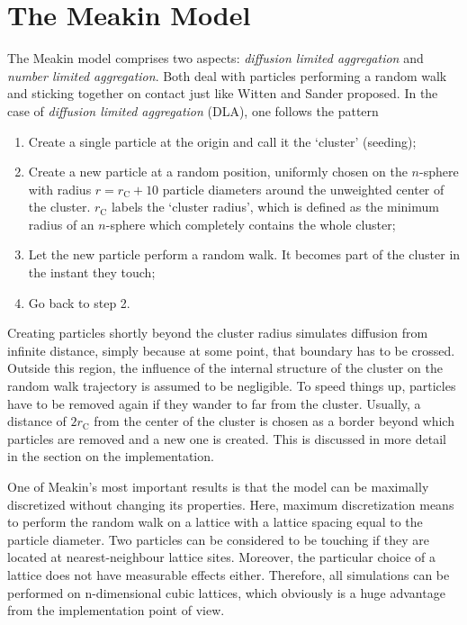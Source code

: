 \documentclass[twocolumn, 10pt]{scrartcl}
\begin{document}
    \section{The Meakin Model}
        The Meakin model comprises two aspects: \emph{diffusion limited aggregation} and \emph{number limited
        aggregation}. Both deal with particles performing a random walk and sticking together on contact just like
        Witten and Sander proposed. In the case of \emph{diffusion limited aggregation} (DLA), one follows the
        pattern
        \begin{enumerate}
            \item Create a single particle at the origin and call it the `cluster' (seeding);
            \item Create a new particle at a random position, uniformly chosen on the $n$-sphere with radius
                $r=r_\mathrm{C}+10$ particle diameters around the unweighted center of the cluster.
                $r_\mathrm{C}$ labels the `cluster radius', which
                is defined as the minimum radius of an $n$-sphere which completely contains the whole cluster;
            \item Let the new particle perform a random walk. It becomes part of the cluster in the instant
                they touch;
            \item Go back to step 2.
        \end{enumerate}
        Creating particles shortly beyond the cluster radius simulates diffusion from infinite distance, simply
        because at some point, that boundary has to be crossed. Outside this region, the influence of the
        internal structure of the cluster on the random walk trajectory is assumed to be negligible. To speed things up,
        particles have to be removed again if they wander to far from the cluster. Usually, a distance of
        $2r_\mathrm{C}$ from the center of the cluster is chosen as a border beyond which particles are removed
        and a new one is created. This is discussed in more detail in the section on the implementation.
       
        One of Meakin's most important results is that the model can be maximally discretized without changing
        its properties. Here, maximum discretization means to perform the random walk on a lattice with
        a lattice spacing equal to the particle diameter. Two particles can be considered to be touching if
        they are located at nearest-neighbour lattice sites. Moreover, the particular choice of a lattice does
        not have measurable effects either. Therefore, all simulations can be performed on n-dimensional
        cubic lattices, which obviously is a huge advantage from the implementation point of view.
\end{document}
